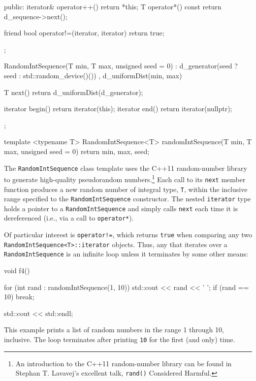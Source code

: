 {{\begin{emcppslisting}[emcppsbatch=e2]
{{    public:
        iterator& operator++() { return *this; }
        T operator*() const { return d_sequence->next(); }

        friend bool operator!=(iterator, iterator) { return true; }
    };

    RandomIntSequence(T min, T max, unsigned seed = 0)
        : d_generator(seed ? seed : std::random_device()())
        , d_uniformDist(min, max) { }

    T next() { return d_uniformDist(d_generator); }

    iterator begin() { return iterator(this); }
    iterator end()   { return iterator(nullptr); }
};

template <typename T>
RandomIntSequence<T> randomIntSequence(T min, T max, unsigned seed = 0)
{
    return {min, max, seed};
}
\end{emcppslisting}
    

\noindent The \lstinline!RandomIntSequence! class template uses the C++11
random-number library to generate high-quality pseudorandom
numbers.{\cprotect\footnote{An introduction to the C++11 random-number
library can be found in Stephan T. Lavavej's excellent talk,
  \lstinline!rand()! Considered Harmful.}} Each call to its \lstinline!next!
member function produces a new random number of integral type,
\lstinline!T!, within the inclusive range specified to the
\lstinline!RandomIntSequence! constructor. The nested \lstinline!iterator!
type holds a pointer to a \lstinline!RandomIntSequence! and simply calls
\lstinline!next! each time it is dereferenced (i.e., via a call to
\lstinline!operator*!).

Of particular interest is \lstinline|operator!=|, which returns
\lstinline!true! when comparing any two
\lstinline!RandomIntSequence<T>::iterator! objects. Thus, any
 that iterates over a
\lstinline!RandomIntSequence! is an infinite loop unless it terminates by
some other means:

\begin{emcppslisting}[emcppsbatch=e2]
void f4()
{
    for (int rand : randomIntSequence(1, 10))
    {
        std::cout << rand << ' ';
        if (rand == 10) { break; }
    }

    std::cout << std::endl;
}
\end{emcppslisting}
    

\noindent This example prints a list of random numbers in the range 1 through 10,
inclusive. The loop terminates after printing \lstinline!10! for the first
(and only) time.

}}
